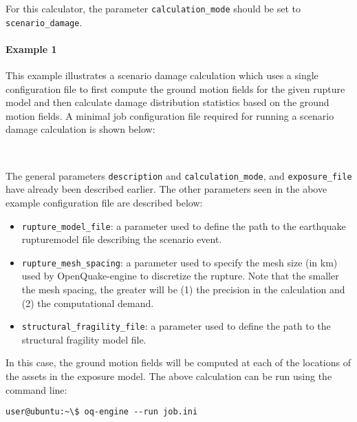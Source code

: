 For this calculator, the parameter \Verb+calculation_mode+ should be set to
\Verb+scenario_damage+.

\paragraph{Example 1}

This example illustrates a scenario damage calculation which uses a single
configuration file to first compute the ground motion fields for the given
rupture model and then calculate damage distribution statistics based on the
ground motion fields. A minimal job configuration file required for
running a scenario damage calculation is shown below:

\inputminted[firstline=1,firstnumber=1,fontsize=\footnotesize,frame=single,linenos,bgcolor=lightgray,label=job.ini]{ini}{oqum/risk/verbatim/config_scenario_damage_combined.ini}\\

The general parameters \Verb+description+ and \Verb+calculation_mode+, and
\Verb+exposure_file+ have already been described earlier. The other parameters
seen in the above example configuration file are described below:

\begin{itemize}

  \item \Verb+rupture_model_file+: a parameter used to define the path
	to the earthquake \gls{rupturemodel} file describing the scenario event.

  \item \Verb+rupture_mesh_spacing+: a parameter used to specify the mesh size
  	(in km) used by OpenQuake-engine to discretize the rupture.
  	Note that the smaller the mesh spacing, the greater will be
  	(1) the precision in the calculation and
  	(2) the computational demand.

  \item \Verb+structural_fragility_file+: a parameter used to define the path
	to the structural \gls{fragility model} file.

\end{itemize}

In this case, the ground motion fields will be computed at each of the
locations of the assets in the exposure model. The above calculation can be
run using the command line:

\begin{Verbatim}[frame=single, commandchars=\\\{\}, samepage=true]
user@ubuntu:~\$ oq-engine --run job.ini
\end{Verbatim}

